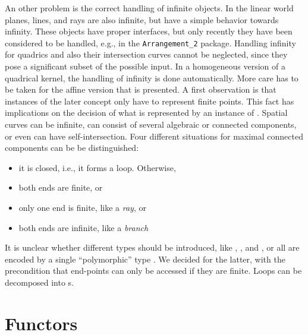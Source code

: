 An other problem is the correct handling of infinite objects. In the linear
world planes, lines, and rays are also infinite, but have a
simple behavior towards infinity. These objects have proper interfaces,
but only recently they have been considered to be handled, e.g.,
in the {\tt Arrangement\_2} package. 
Handling infinity for quadrics and also their intersection curves cannot
be neglected, since they pose a significant subset of the possible input.
In a homogeneous version of a quadrical kernel, the handling of infinity
is done automatically. More care has to be taken 
for the affine version that is presented.
A first observation is that instances of the later concept 
 only have to represent finite points.
This fact has implications on the decision of what is represented
by an instance of .
Spatial curves can be infinite,
can consist of several algebraic or connected components, or even can have 
self-intersection. Four different situations for maximal connected
components can be be distinguished: 
\begin{itemize}
\item it is closed, i.e., it forms a loop. Otherwise,
\item both ends are finite, or
\item only one end is finite, like a {\em ray}, or 
\item both ends are infinite, like a {\em branch}
\end{itemize}
It is unclear
whether different types should be introduced, like ,
, 
 and , or
all are encoded by a single ``polymorphic'' type . 
We decided for the latter, with the precondition
that end-points can only be accessed if they are finite. Loops can be
decomposed into s.

\section{Functors}

